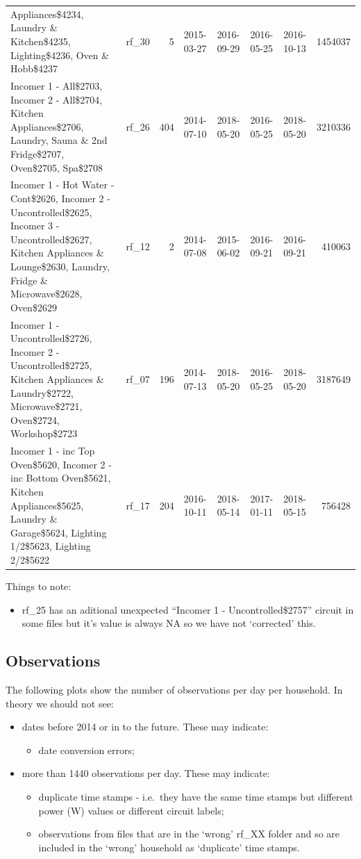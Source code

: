 \documentclass[]{article}
\providecommand{\tightlist}{%
  \setlength{\itemsep}{0pt}\setlength{\parskip}{0pt}}
\begin{document}
\begin{longtable}[]{@{}llrllllr@{}}
Appliances\$4234, Laundry \& Kitchen\$4235, Lighting\$4236, Oven \&
Hobb\$4237 & rf\_30 & 5 & 2015-03-27 & 2016-09-29 & 2016-05-25 &
2016-10-13 & 1454037\tabularnewline
Incomer 1 - All\$2703, Incomer 2 - All\$2704, Kitchen Appliances\$2706,
Laundry, Sauna \& 2nd Fridge\$2707, Oven\$2705, Spa\$2708 & rf\_26 & 404
& 2014-07-10 & 2018-05-20 & 2016-05-25 & 2018-05-20 &
3210336\tabularnewline
Incomer 1 - Hot Water - Cont\$2626, Incomer 2 - Uncontrolled\$2625,
Incomer 3 - Uncontrolled\$2627, Kitchen Appliances \& Lounge\$2630,
Laundry, Fridge \& Microwave\$2628, Oven\$2629 & rf\_12 & 2 & 2014-07-08
& 2015-06-02 & 2016-09-21 & 2016-09-21 & 410063\tabularnewline
Incomer 1 - Uncontrolled\$2726, Incomer 2 - Uncontrolled\$2725, Kitchen
Appliances \& Laundry\$2722, Microwave\$2721, Oven\$2724, Workshop\$2723
& rf\_07 & 196 & 2014-07-13 & 2018-05-20 & 2016-05-25 & 2018-05-20 &
3187649\tabularnewline
Incomer 1 - inc Top Oven\$5620, Incomer 2 - inc Bottom Oven\$5621,
Kitchen Appliances\$5625, Laundry \& Garage\$5624, Lighting 1/2\$5623,
Lighting 2/2\$5622 & rf\_17 & 204 & 2016-10-11 & 2018-05-14 & 2017-01-11
& 2018-05-15 & 756428\tabularnewline
\bottomrule
\end{longtable}

Things to note:

\begin{itemize}
\tightlist
\item
  rf\_25 has an aditional unexpected ``Incomer 1 - Uncontrolled\$2757''
  circuit in some files but it's value is always NA so we have not
  `corrected' this.
\end{itemize}

\subsection{Observations}\label{observations}

The following plots show the number of observations per day per
household. In theory we should not see:

\begin{itemize}
\tightlist
\item
  dates before 2014 or in to the future. These may indicate:

  \begin{itemize}
  \tightlist
  \item
    date conversion errors;
  \end{itemize}
\item
  more than 1440 observations per day. These may indicate:

  \begin{itemize}
  \tightlist
  \item
    duplicate time stamps - i.e.~they have the same time stamps but
    different power (W) values or different circuit labels;
  \item
    observations from files that are in the `wrong' rf\_XX folder and so
    are included in the `wrong' household as `duplicate' time stamps.
  \end{itemize}
\end{itemize}
\end{document}
